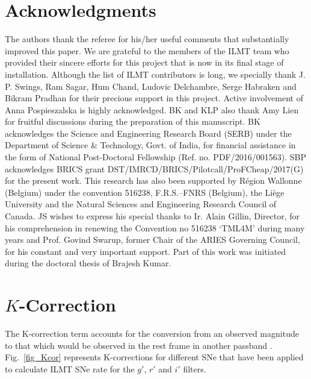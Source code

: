 \documentclass[useAMS,usenatbib]{mnras}
\begin{document}
\section*{Acknowledgments}
The authors thank the referee for his/her useful comments that substantially improved this paper.
We are grateful to the members of the ILMT team who provided their sincere efforts for this project
that is now in its final stage of installation. Although the list of ILMT contributors is long, we 
specially thank J. P. Swings, Ram Sagar, Hum Chand, Ludovic Delchambre, Serge Habraken and Bikram Pradhan
for their precious support in this project. 
Active involvement of Anna Pospieszalska is highly acknowledged.
BK and KLP also thank Amy Lien for fruitful discussions during the preparation of this manuscript.
BK acknowledges the Science and Engineering Research Board (SERB) under the Department of Science 
\& Technology, Govt. of India, for financial assistance in the form of National Post-Doctoral 
Fellowship (Ref. no. PDF/2016/001563).
SBP acknowledges BRICS grant DST/IMRCD/BRICS/Pilotcall/ProFCheap/2017(G) for the present work.
This research has also been supported by R\'{e}gion Wallonne (Belgium) under the convention 516238,
F.R.S.--FNRS (Belgium), the Li\`{e}ge University and the Natural Sciences and Engineering Research
Council of Canada. JS wishes to express his special thanks to Ir. Alain Gillin, Director,
for his comprehension in renewing the Convention no 516238 `TML4M' during many years and 
Prof. Govind Swarup, former Chair of the ARIES Governing Council, for his constant and very important
support. Part of this work was initiated during the doctoral thesis of Brajesh Kumar.



\appendix 
\section{$K$-Correction}
The K-correction term accounts for the conversion from an observed magnitude to that which would be observed
in the rest frame in another passband \citep{1956AJ.....61...97H,1968ApJ...154...21O}.
Fig.~\ref{fig_Kcor} represents K-corrections for different SNe that have been applied to calculate
ILMT SNe rate for the $g'$, $r'$ and $i'$ filters.
\end{document}

